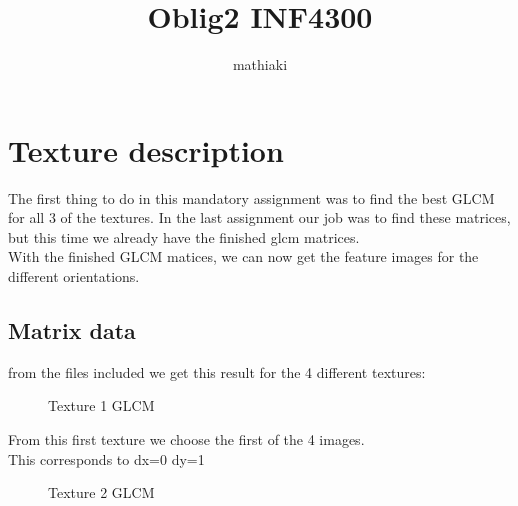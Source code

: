 \documentclass{article}
\title{Oblig2 INF4300}
\author{mathiaki}
\begin{document}
\maketitle

\newpage
\tableofcontents
\newpage

\section{Texture description}
	The first thing to do in this mandatory assignment was to find the best GLCM for all 3 	of the textures. In the last assignment our job was to find these matrices, but this time we already have the finished glcm matrices.\\
	
	With the finished GLCM matices, we can now get the feature images for the different 		orientations.\\
	

\subsection{Matrix data}
	from the files included we get this result for the 4 different textures:
	\begin{figure}[h]%
		\centering
    	\caption{Texture 1 GLCM}%
    	\label{fig:o1_f1}%
	\end{figure}

	From this first texture we choose the first of the 4 images.\\
	This corresponds to dx=0 dy=1  
\newpage

	\begin{figure}[h]%
		\centering
    	\caption{Texture 2 GLCM}%
    	\label{fig:o1_f2}%
	\end{figure}
\end{document}

